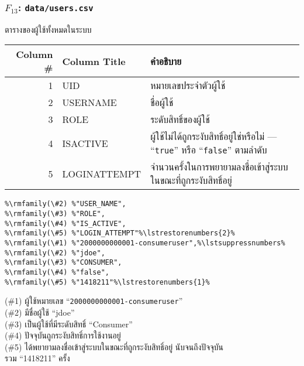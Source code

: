\begin{minipage}{\textwidth}
\subsubsection[\texttt{data/users.csv}]{\texorpdfstring{$ F_{13} $}{File \#13}: \texttt{data/users.csv}}\label{subsubsec:csv-f13}

ตารางของผู้ใช้ทั้งหมดในระบบ

\begin{tabular}[!hbt]{| r | >{\ttfamily}p{15ex}<{\rmfamily} | p{36ex} |}
\hline
Column \#       & \rmfamily Column Title                & คำอธิบาย\\
\hline
1               & UID                                   & หมายเลขประจำตัวผู้ใช้\\
2               & USER\textunderscore{}NAME             & ชื่อผู้ใช้\\
3               & ROLE                                  & ระดับสิทธิ์ของผู้ใช้\\
4               & IS\textunderscore{}ACTIVE             & ผู้ใช้ไม่ได้ถูกระงับสิทธิ์อยู่ใช่หรือไม่ --- ``\texttt{true}'' หรือ ``\texttt{false}'' ตามลำดับ\\
5               & LOGIN\textunderscore{}ATTEMPT         & จำนวนครั้งในการพยายามลงชื่อเข้าสู่ระบบในขณะที่ถูกระงับสิทธิ์อยู่\\
\hline
\end{tabular}


\begin{lstlisting}[caption={\texttt{data/users.csv}}]
%\rmfamily(\#1) %"UID",%\lstsuppressnumbers%
%\rmfamily(\#2) %"USER_NAME",
%\rmfamily(\#3) %"ROLE",
%\rmfamily(\#4) %"IS_ACTIVE",
%\rmfamily(\#5) %"LOGIN_ATTEMPT"%\lstrestorenumbers{2}%
%\rmfamily(\#1) %"2000000000001-consumeruser",%\lstsuppressnumbers%
%\rmfamily(\#2) %"jdoe",
%\rmfamily(\#3) %"CONSUMER",
%\rmfamily(\#4) %"false",
%\rmfamily(\#5) %"1418211"%\lstrestorenumbers{1}%
\end{lstlisting}

\begin{description}[labelwidth=*]
    \item[$ \Rightarrow $] (\#1) ผู้ใช้หมายเลข ``\texttt{2000000000001-consumeruser}''\\
(\#2) มีชื่อผู้ใช้ ``jdoe''\\
(\#3) เป็นผู้ใช้ที่มีระดับสิทธิ์ ``Consumer''\\
(\#4) ปัจจุบันถูกระงับสิทธิ์การใช้งานอยู่\\
(\#5) ได้พยายามลงชื่อ\mbox{เข้าสู่ระบบ}ในขณะที่ถูกระงับสิทธิ์อยู่ นับจนถึงปัจจุบัน\\
\hspace{4ex}รวม ``1418211'' ครั้ง
\end{description}
\end{minipage}
